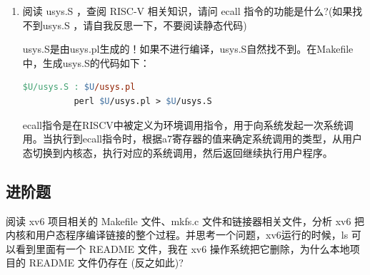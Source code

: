 \documentclass[UTF8]{article}
\begin{document}
\begin{enumerate}
\begin{lstlisting}[language=perl]
      entry("read"); # 生成read系统调用的汇编代码
    \end{lstlisting}

    所生成的汇编代码在user/usys.S中：

    \begin{lstlisting}[language=s]
      .global read
      read:
       li a7, SYS_read
       ecall
       ret
    \end{lstlisting}    

    \texttt{printf()}不是系统调用，函数声明在user/user.h中，定义在user/printf.c中。

    声明如下：

    \begin{lstlisting}[language=C]
      // ulib.c
      void printf(const char*, ...) __attribute__ ((format (printf, 1, 2))); // __attribute__ ((format (printf, 1, 2))) 用于指定函数的格式属性。它让编译器在编译时检查 printf 函数的调用，确保传入的格式字符串和参数类型匹配
    \end{lstlisting}

    定义就不复制过来了。

    \item 阅读 usys.S ，查阅 RISC-V 相关知识，请问 ecall 指令的功能是什么?(如果找不到usys.S ，请自我反思一下，不要阅读静态代码)
    
    usys.S是由usys.pl生成的！如果不进行编译，usys.S自然找不到。在Makefile中，生成usys.S的代码如下：

    \begin{lstlisting}[language=make]
      $U/usys.S : $U/usys.pl
          perl $U/usys.pl > $U/usys.S
    \end{lstlisting}

    ecall指令是在RISCV中被定义为环境调用指令，用于向系统发起一次系统调用。当执行到ecall指令时，根据a7寄存器的值来确定系统调用的类型，从用户态切换到内核态，执行对应的系统调用，然后返回继续执行用户程序。
\end{enumerate}

\subsection{进阶题}

\noindent
阅读 xv6 项目相关的 Makefile 文件、mkfs.c 文件和链接器相关文件，分析 xv6 把内核和用户态程序编译链接的整个过程。并思考一个问题，xv6运行的时候，ls 可以看到里面有一个 README 文件，我在 xv6 操作系统把它删除，为什么本地项目的 README 文件仍存在 (反之如此)?

\vspace{1em}
\end{document}
